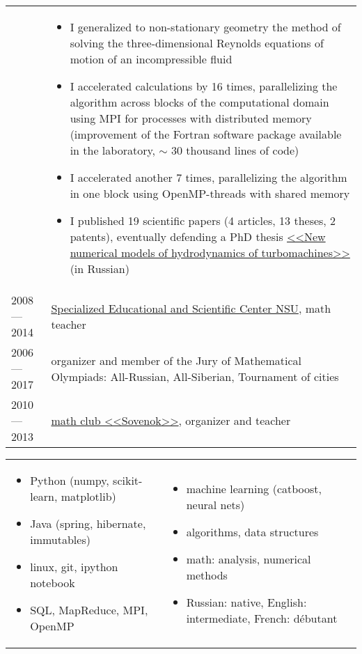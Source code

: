 \documentclass[11pt]{article}
\begin{document}
\begin{longtable} {l | p{}}
& \vspace{-1.5em} \begin{itemize}
	\item I generalized to non-stationary geometry the method of solving the three-dimensional Reynolds equations of motion of an incompressible fluid
	\item I accelerated calculations by 16 times, parallelizing the algorithm across blocks of the computational domain using MPI for processes with distributed memory (improvement of the Fortran software package available in the laboratory, $\sim$ 30 thousand lines of code)
	\item I accelerated another 7 times, parallelizing the algorithm in one block using OpenMP-threads with shared memory
	\item I published 19 scientific papers (4 articles, 13 theses, 2 patents), eventually defending a PhD thesis \href{https://github.com/avalur/dissertation/blob/master/to_print/autoref_Avdyushenko.pdf}{<<New numerical models of hydrodynamics of turbomachines>>} (in Russian)
\end{itemize}
\\

2008 — 2014 & {\href{http://sesc.nsu.ru}{Specialized Educational and Scientific Center NSU}, math teacher}\\
2006 — 2017 & {organizer and member of the Jury of Mathematical Olympiads: All-Russian, All-Siberian, Tournament of cities}\\
2010 — 2013 & {\href{https://www.sovenok.academy/}{math club <<Sovenok>>}, organizer and teacher}\\

\end{longtable}

\begin{longtable} {p{}p{}}
\vspace{-2em}
\begin{itemize}
	\item Python (numpy, scikit-learn, matplotlib)
	\item Java (spring, hibernate, immutables)
	\item linux, git, ipython notebook
	\item SQL, MapReduce, MPI, OpenMP
\end{itemize}
&
\vspace{-2em}
\begin{itemize}
	\item machine learning (catboost, neural nets)
	\item algorithms, data structures
	\item math: analysis, numerical methods
	\item Russian: native, English: intermediate, French: débutant
\end{itemize}
\\
\end{longtable}
\end{document}
